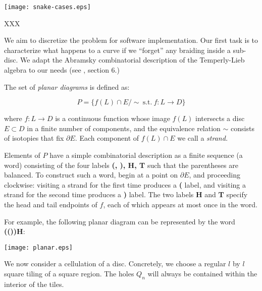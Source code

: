 \documentclass[11pt,a4paper]{article}
\begin{document}
\begin{center}
\texttt{[image: snake-cases.eps]}
\end{center}

XXX



We aim to discretize the problem for software implementation.
Our first task is to characterize what happens to a curve
if we ``forget'' any braiding inside a sub-disc.
We adapt the Abramsky combinatorial description 
of the Temperly-Lieb algebra to our needs
(see \cite{Abramsky08}, section 6.) %

The set of {\it planar diagrams} is defined as:

    $$ P = \{ f(L)\cap E / \sim \ \text{s.t.}\ f:L\to D \}$$

where $f:L\to D$ is a continuous function 
whose image $f(L)$ intersects a disc $E\subset D$ in a finite number of components,
and the equivalence relation $\sim$ consists of 
isotopies that fix $\partial E.$ %
Each component of $f(L)\cap E$ we call a {\it strand.}

Elements of $P$ have a simple combinatorial description 
as a finite sequence (a word) consisting of
the four labels {\bf (, ), H, T} such that 
the parentheses are balanced.
To construct such a word, begin at a point on $\partial E$, and proceeding
clockwise: visiting a strand for the first time produces a {\bf ( } label,
and visiting a strand for the second time produces a {\bf ) } label.
The two labels {\bf H} and {\bf T} specify the
head and tail endpoints of $f$, each of which appears at most once in the word.

For example, the following planar diagram can be represented by
the word {\bf(())H}:

\begin{center}
\texttt{[image: planar.eps]}
\end{center}




We now consider a cellulation of a disc.
Concretely, we choose a regular $l$ by $l$ square tiling of a square region.
The holes $Q_n$ will always be contained within the interior of the
tiles.
\end{document}
